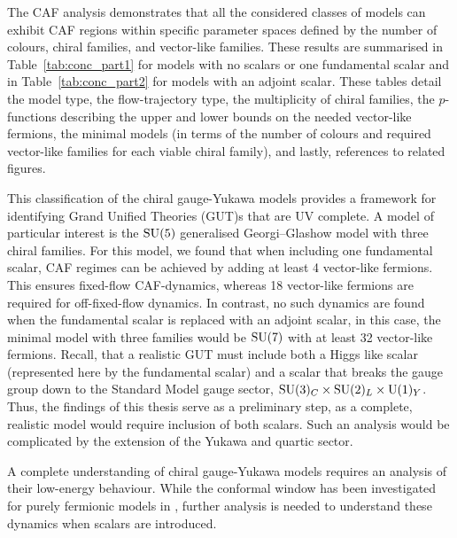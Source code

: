 The CAF analysis demonstrates that all the considered classes of models can exhibit CAF regions within specific parameter spaces defined by the number of colours, chiral families, and vector-like families. These results are summarised in Table~\ref{tab:conc_part1} for models with no scalars or one fundamental scalar and in Table~\ref{tab:conc_part2} for models with an adjoint scalar. These tables detail the model type, the flow-trajectory type, the multiplicity of chiral families, the $p$-functions describing the upper and lower bounds on the needed vector-like fermions, the minimal models (in terms of the number of colours and required vector-like families for each viable chiral family), and lastly, references to related figures. 

This classification of the chiral gauge-Yukawa models provides a framework for identifying Grand Unified Theories (GUT)s that are UV complete. A model of particular interest is the $\mathrm{SU}(5)$ generalised Georgi--Glashow model with three chiral families. For this model, we found that when including one fundamental scalar, CAF regimes can be achieved by adding at least 4 vector-like fermions. This ensures fixed-flow CAF-dynamics, whereas 18 vector-like fermions are required for off-fixed-flow dynamics. In contrast, no such dynamics are found when the fundamental scalar is replaced with an adjoint scalar, in this case, the minimal model with three families would be $\mathrm{SU}(7)$ with at least 32 vector-like fermions. Recall, that a realistic GUT must include both a Higgs like scalar (represented here by the fundamental scalar) and a scalar that breaks the gauge group down to the Standard Model gauge sector, $\mathrm{SU}(3)_C\times\mathrm{SU}(2)_L\times \mathrm{U}(1)_Y$. Thus, the findings of this thesis serve as a preliminary step, as a complete, realistic model would require inclusion of both scalars. Such an analysis would be complicated by the extension of the Yukawa and quartic sector.

A complete understanding of chiral gauge-Yukawa models requires an analysis of their low-energy behaviour. While the conformal window has been investigated for purely fermionic models in \cite{Appelquist:2000qg,Pica:2016krb}, further analysis is needed to understand these dynamics when scalars are introduced. 


